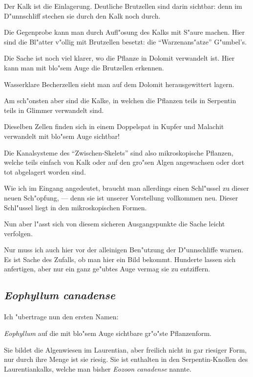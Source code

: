 \documentclass[a4paper, 11pt, oneside, german]{article}
\begin{document}
Der Kalk ist die Einlagerung. Deutliche Brutzellen sind darin sichtbar: denn im D"unnschliff stechen sie durch den Kalk noch durch.

Die Gegenprobe kann man durch Aufl"osung des Kalks mit S"aure machen. Hier sind die Bl"atter v"ollig mit Brutzellen besetzt: die "`Warzenans"atze"' G"umbel's.

Die Sache ist noch viel klarer, wo die Pflanze in Dolomit verwandelt ist. Hier kann man mit blo"sem Auge die Brutzellen erkennen.

Wasserklare Becherzellen sieht man auf dem Dolomit herausgewittert lagern.

Am sch"onsten aber sind die Kalke, in welchen die Pflanzen teils in Serpentin teils in Glimmer verwandelt sind.

Dieselben Zellen finden sich in einem Doppelspat in Kupfer und Malachit verwandelt mit blo"sem Auge sichtbar!

Die Kanalsysteme des "`Zwischen-Skelets"' sind also mikroskopische Pflanzen, welche teils einfach von Kalk oder auf den gro"sen Algen angewachsen oder dort tot abgelagert worden sind.

Wie ich im Eingang angedeutet, braucht man allerdings einen Schl"ussel zu dieser neuen Sch"opfung, --- denn sie ist unserer Vorstellung vollkommen neu. Dieser Schl"ussel liegt in den mikroskopischen Formen.

Nun aber l"asst sich von diesem sicheren Ausgangspunkte die Sache leicht verfolgen.

Nur muss ich auch hier vor der alleinigen Ben"utzung der D"unnschliffe warnen. Es ist Sache des Zufalls, ob man hier ein Bild bekommt. Hunderte lassen sich anfertigen, aber nur ein ganz ge"ubtes Auge vermag sie zu entziffern.
\clearpage
\subsection{\emph{Eophyllum canadense}}
\paragraph{}
Ich "ubertrage nun den ersten Namen:

\emph{Eophyllum} auf die mit blo"sem Auge sichtbare gr"o"ste Pflanzenform.

Sie bildet die Algenwiesen im Laurentian, aber freilich nicht in gar riesiger Form, nur durch ihre Menge ist sie riesig. Sie ist enthalten in den Serpentin-Knollen des Laurentiankalks, welche man bisher \emph{Eozoon canadense} nannte.
\end{document}

